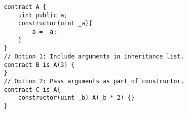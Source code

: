 \begin{lstlisting}[language=Solidity]
contract A {
	uint public a;
	constructor(uint _a){
		a = _a;
	}
}
// Option 1: Include arguments in inheritance list.
contract B is A(3) {
}
// Option 2: Pass arguments as part of constructor.
contract C is A{
	constructor(uint _b) A(_b * 2) {}
}
\end{lstlisting}